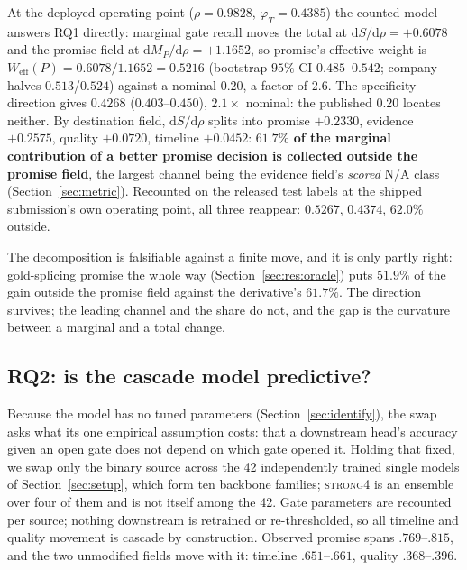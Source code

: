 At the deployed operating point ($\rho = 0.9828$, $\varphi_T = 0.4385$) the counted model answers
RQ1 directly: marginal gate recall moves the total at
$\mathrm{d}S/\mathrm{d}\rho = +0.6078$ and the promise field at
$\mathrm{d}M_P/\mathrm{d}\rho = +1.1652$, so promise's effective weight is
$W_{\mathrm{eff}}(P) = 0.6078/1.1652 = \mathbf{0.5216}$ (bootstrap $95\%$ CI
$0.485$--$0.542$; company halves $0.513$/$0.524$) against a nominal $0.20$, a factor of $2.6$. The specificity
direction gives $0.4268$ ($0.403$--$0.450$), $2.1\times$ nominal: the published $0.20$ locates
neither. By destination field, $\mathrm{d}S/\mathrm{d}\rho$ splits into promise $+0.2330$,
evidence $+0.2575$, quality $+0.0720$, timeline $+0.0452$: \textbf{$61.7\%$ of the marginal
contribution of a better promise decision is collected outside the promise field}, the largest
channel being the evidence field's \emph{scored} N/A class (Section~\ref{sec:metric}).
Recounted on the released test labels at the shipped submission's own operating point, all three
reappear: $0.5267$, $0.4374$, $62.0\%$ outside.

The decomposition is falsifiable against a finite move, and it is only partly right:
gold-splicing promise the whole way (Section~\ref{sec:res:oracle}) puts $51.9\%$ of the gain
outside the promise field against the derivative's $61.7\%$. The direction survives; the leading
channel and the share do not, and the gap is the curvature between a marginal and a total
change.

\subsection{RQ2: is the cascade model predictive?}
\label{sec:res:swap}

Because the model has no tuned parameters (Section~\ref{sec:identify}), the swap asks what its one
empirical assumption costs: that a downstream head's accuracy given an open gate does not depend
on which gate opened it. Holding that fixed, we swap only the binary source across the 42
independently trained single models of Section~\ref{sec:setup}, which form ten backbone families;
\textsc{strong4} is an ensemble over four of them and is not itself among the 42. Gate parameters
are recounted per source; nothing downstream is retrained or re-thresholded, so all timeline and
quality movement is cascade by construction. Observed promise spans $.769$--$.815$, and the two
unmodified fields move with it: timeline $.651$--$.661$, quality $.368$--$.396$.

